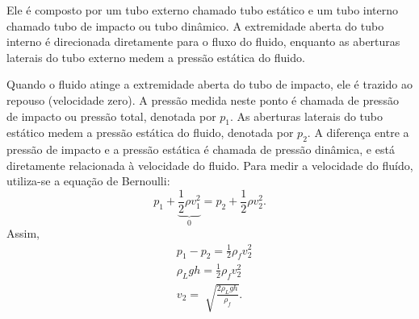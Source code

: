 \documentclass[physicsII_notes.tex]{subfiles}
\begin{document}
Ele é composto por um tubo externo chamado tubo estático e um tubo interno
chamado tubo de impacto ou tubo dinâmico. A extremidade aberta do tubo interno
é direcionada diretamente para o fluxo do fluido, enquanto as aberturas laterais
do tubo externo medem a pressão estática do fluido.

Quando o fluido atinge a extremidade aberta do tubo de impacto, ele é trazido
ao repouso (velocidade zero). A pressão medida neste ponto é chamada de pressão
de impacto ou pressão total, denotada por \(p_{1}\). As aberturas laterais do tubo estático medem a pressão
estática do fluido, denotada por \(p_{2}\). A diferença entre a pressão de impacto e a pressão estática é chamada
de pressão dinâmica, e está diretamente relacionada à velocidade do fluido. Para medir a velocidade
do fluído, utiliza-se a equação de Bernoulli:
\[
	p_{1} + \underbrace{\frac{1}{2}\rho v_{1}^{2}}_{0} = p_{2} + \frac{1}{2}\rho v_{2}^{2}.
\]
Assim,
\begin{align*}
	 & p_{1}-p_{2} = \frac{1}{2}\rho_{f}v_{2}^{2}     \\
	 & \rho_{L}gh = \frac{1}{2}\rho_{f}v_{2}^{2}      \\
	 & v_{2} = \sqrt[]{\frac{2\rho_{L}gh}{\rho_{f}}}.
\end{align*}
\end{document}
